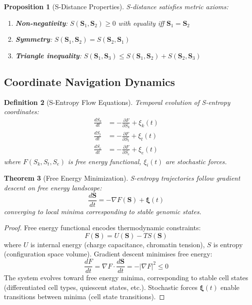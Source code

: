 \documentclass[11pt,a4paper]{article}
\newtheorem{theorem}{Theorem}[section]
\newtheorem{definition}[theorem]{Definition}
\newtheorem{proposition}[theorem]{Proposition}
\theoremstyle{remark}
\newcommand{\Sk}{S_k}
\newcommand{\St}{S_t}
\newcommand{\Se}{S_e}
\newcommand{\Scoord}{\mathbf{S}}
\begin{document}
\begin{proposition}[S-Distance Properties]
\label{prop:s_distance_properties}
S-distance satisfies metric axioms:
\begin{enumerate}
\item \textbf{Non-negativity}: $S(\Scoord_1, \Scoord_2) \geq 0$ with equality iff $\Scoord_1 = \Scoord_2$
\item \textbf{Symmetry}: $S(\Scoord_1, \Scoord_2) = S(\Scoord_2, \Scoord_1)$
\item \textbf{Triangle inequality}: $S(\Scoord_1, \Scoord_3) \leq S(\Scoord_1, \Scoord_2) + S(\Scoord_2, \Scoord_3)$
\end{enumerate}
\end{proposition}

\subsection{Coordinate Navigation Dynamics}

\begin{definition}[S-Entropy Flow Equations]
\label{def:s_entropy_flow}
Temporal evolution of S-entropy coordinates:
\begin{align}
\frac{d\Sk}{dt} &= -\frac{\partial F}{\partial \Sk} + \xi_k(t) \\
\frac{d\St}{dt} &= -\frac{\partial F}{\partial \St} + \xi_t(t) \\
\frac{d\Se}{dt} &= -\frac{\partial F}{\partial \Se} + \xi_e(t)
\end{align}
where $F(\Sk, \St, \Se)$ is free energy functional, $\xi_i(t)$ are stochastic forces.
\end{definition}

\begin{theorem}[Free Energy Minimization]
\label{thm:free_energy_min}
S-entropy trajectories follow gradient descent on free energy landscape:
\begin{equation}
\frac{d\Scoord}{dt} = -\nabla F(\Scoord) + \boldsymbol{\xi}(t)
\end{equation}
converging to local minima corresponding to stable genomic states.
\end{theorem}

\begin{proof}
Free energy functional encodes thermodynamic constraints:
\begin{equation}
F(\Scoord) = U(\Scoord) - TS(\Scoord)
\end{equation}
where $U$ is internal energy (charge capacitance, chromatin tension), $S$ is entropy (configuration space volume). Gradient descent minimises free energy:
\begin{equation}
\frac{dF}{dt} = \nabla F \cdot \frac{d\Scoord}{dt} = -|\nabla F|^2 \leq 0
\end{equation}
The system evolves toward free energy minima, corresponding to stable cell states (differentiated cell types, quiescent states, etc.). Stochastic forces $\boldsymbol{\xi}(t)$ enable transitions between minima (cell state transitions).
\end{proof}
\end{document}
